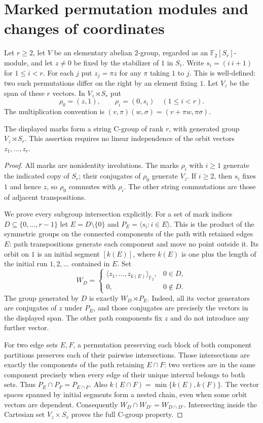 \section{Marked permutation modules and changes of coordinates}
Let $r\geq2$, let $V$ be an elementary abelian $2$-group, regarded as an
$\mathbb F_2[S_r]$-module, and let $z\ne0$ be fixed by the stabilizer of
$1$ in $S_r$. Write $s_i=(i\ i+1)$ for $1\leq i<r$. For each $j$ put
$z_j=\pi z$ for any $\pi$ taking $1$ to $j$. This is well-defined:
two such permutations differ on the right by an element fixing $1$.
Let $V_z$ be the span of these $r$ vectors. In $V_z\rtimes S_r$ put
\[
 \rho_0=(z,1),\qquad \rho_i=(0,s_i)\quad(1\leq i<r).
\]
The multiplication convention is $(v,\pi)(w,\sigma)=(v+\pi w,\pi\sigma)$.

\begin{theorem}\label{M-thm:module-marking}
The displayed marks form a string C-group of rank $r$, with generated
group $V_z\rtimes S_r$. This assertion requires no linear independence
of the orbit vectors $z_1,\ldots,z_r$.
\end{theorem}
\begin{proof}
All marks are nonidentity involutions. The marks $\rho_i$ with $i\geq1$
generate the indicated copy of $S_r$; their conjugates of $\rho_0$
generate $V_z$. If $i\geq2$, then $s_i$ fixes $1$ and hence $z$, so
$\rho_0$ commutes with $\rho_i$. The other string commutations are
those of adjacent transpositions.

We prove every subgroup intersection explicitly. For a set of mark
indices $D\subseteq\{0,\ldots,r-1\}$ let $E=D\setminus\{0\}$ and
$P_E=\langle s_i:i\in E\rangle$. This is the product of the symmetric
groups on the connected components of the path with retained edges $E$:
path transpositions generate each component and move no point outside
it. Its orbit on $1$ is an initial segment $[k(E)]$, where $k(E)$ is
one plus the length of the initial run $1,2,\ldots$ contained in $E$.
Set
\[
 W_D=\begin{cases}
 \langle z_1,\ldots,z_{k(E)}\rangle_{\mathbb F_2},&0\in D,\\
 0,&0\notin D.
 \end{cases}
\]
The group generated by $D$ is exactly $W_D\rtimes P_E$. Indeed, all
its vector generators are conjugates of $z$ under $P_E$, and those
conjugates are precisely the vectors in the displayed span. The
other path components fix $z$ and do not introduce any further vector.

For two edge sets $E,F$, a permutation preserving each block of both
component partitions preserves each of their pairwise intersections. Those
intersections are exactly the components of the path retaining
$E\cap F$: two vertices are in the same component precisely when every
edge of their unique interval belongs to both sets. Thus
$P_E\cap P_F=P_{E\cap F}$. Also
$k(E\cap F)=\min\{k(E),k(F)\}$. The vector spaces spanned by initial
segments form a nested chain, even when some orbit vectors are dependent.
Consequently $W_D\cap W_{D'}=W_{D\cap D'}$. Intersecting inside the
Cartesian set $V_z\times S_r$ proves the full C-group property.
\end{proof}

